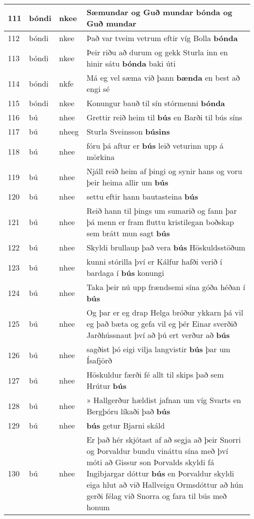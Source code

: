 \documentclass{article}
\begin{document}
\begin{longtable}{p{1cm}|p{1cm}|p{1cm}|p{13cm}}
\hline
111&bóndi&nkee&Sæmundar og Guð mundar \textbf{bónda} og Guð mundar\\
\hline
112&bóndi&nkee&Það var tveim vetrum eftir víg Bolla \textbf{bónda} \\
\hline
113&bóndi&nkee&Þeir riðu að durum og gekk Sturla inn en hinir sátu \textbf{bónda} baki úti\\
\hline
114&bóndi&nkfe&Má eg vel sæma við þann \textbf{bænda} en best að engi sé\\
\hline
115&bóndi&nkee&Konungur bauð til sín stórmenni \textbf{bónda} \\
\hline
116&bú&nhee&Grettir reið heim til \textbf{bús} en Barði til bús síns\\
\hline
117&bú&nheeg&Sturla Sveinsson \textbf{búsins} \\
\hline
118&bú&nhee&fóru þá aftur er \textbf{bús} leið veturinn upp á mörkina\\
\hline
119&bú&nhee&Njáll reið heim af þingi og synir hans og voru þeir heima allir um \textbf{bús} \\
\hline
120&bú&nhee&settu eftir hann bautasteina \textbf{bús} \\
\hline
121&bú&nhee&Reið hann til þings um sumarið og fann þar þá menn er fram fluttu kristilegan boðskap sem brátt mun sagt \textbf{bús} \\
\hline
122&bú&nhee&Skyldi brullaup það vera \textbf{bús} Höskuldsstöðum\\
\hline
123&bú&nhee&kunni stórilla því er Kálfur hafði verið í bardaga í \textbf{bús} konungi\\
\hline
124&bú&nhee&Taka þeir nú upp frændsemi sína góða héðan í \textbf{bús} \\
\hline
125&bú&nhee&Og þar er eg drap Helga bróður ykkarn þá vil eg það bæta og gefa vil eg þér Einar sverðið Jarðhússnaut því að þú ert verður að \textbf{bús} \\
\hline
126&bú&nhee&sagðist þó eigi vilja langvistir \textbf{bús} þar um Ísafjörð\\
\hline
127&bú&nhee&Höskuldur færði fé allt til skips það sem Hrútur \textbf{bús} \\
\hline
128&bú&nhee&» Hallgerður hældist jafnan um víg Svarts en Bergþóru líkaði það \textbf{bús} \\
\hline
129&bú&nhee& \textbf{bús} getur Bjarni skáld\\
\hline
130&bú&nhee&Er það hér skjótast af að segja að þeir Snorri og Þorvaldur bundu vináttu sína með því móti að Gissur son Þorvalds skyldi fá Ingibjargar dóttur \textbf{bús} en Þorvaldur skyldi eiga hlut að við Hallveigu Ormsdóttur að hún gerði félag við Snorra og fara til bús með honum\\

\end{longtable}
\end{document}

